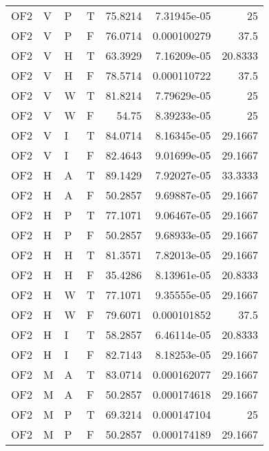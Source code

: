 \begin{longtable}{llllrrr}
    OF2      & V     & P     & T          & 75.8214    & 7.31945e-05 & 25       \\
    OF2      & V     & P     & F          & 76.0714    & 0.000100279 & 37.5     \\
    OF2      & V     & H     & T          & 63.3929    & 7.16209e-05 & 20.8333  \\
    OF2      & V     & H     & F          & 78.5714    & 0.000110722 & 37.5     \\
    OF2      & V     & W     & T          & 81.8214    & 7.79629e-05 & 25       \\
    OF2      & V     & W     & F          & 54.75      & 8.39233e-05 & 25       \\
    OF2      & V     & I     & T          & 84.0714    & 8.16345e-05 & 29.1667  \\
    OF2      & V     & I     & F          & 82.4643    & 9.01699e-05 & 29.1667  \\
    OF2      & H     & A     & T          & 89.1429    & 7.92027e-05 & 33.3333  \\
    OF2      & H     & A     & F          & 50.2857    & 9.69887e-05 & 29.1667  \\
    OF2      & H     & P     & T          & 77.1071    & 9.06467e-05 & 29.1667  \\
    OF2      & H     & P     & F          & 50.2857    & 9.68933e-05 & 29.1667  \\
    OF2      & H     & H     & T          & 81.3571    & 7.82013e-05 & 29.1667  \\
    OF2      & H     & H     & F          & 35.4286    & 8.13961e-05 & 20.8333  \\
    OF2      & H     & W     & T          & 77.1071    & 9.35555e-05 & 29.1667  \\
    OF2      & H     & W     & F          & 79.6071    & 0.000101852 & 37.5     \\
    OF2      & H     & I     & T          & 58.2857    & 6.46114e-05 & 20.8333  \\
    OF2      & H     & I     & F          & 82.7143    & 8.18253e-05 & 29.1667  \\
    OF2      & M     & A     & T          & 83.0714    & 0.000162077 & 29.1667  \\
    OF2      & M     & A     & F          & 50.2857    & 0.000174618 & 29.1667  \\
    OF2      & M     & P     & T          & 69.3214    & 0.000147104 & 25       \\
    OF2      & M     & P     & F          & 50.2857    & 0.000174189 & 29.1667  \\

\end{longtable}
